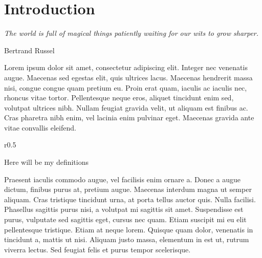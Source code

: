 \chapter{Introduction}
\epigraph{\emph{The world is full of magical things patiently waiting for our wits to grow sharper.}}{Bertrand Russel}


Lorem ipsum dolor sit amet, consectetur adipiscing elit. Integer nec venenatis augue. Maecenas sed egestas elit, quis ultrices lacus. Maecenas hendrerit massa nisi, congue congue quam pretium eu. Proin erat quam, iaculis ac iaculis nec, rhoncus vitae tortor. Pellentesque neque eros, aliquet tincidunt enim sed, volutpat ultrices nibh. Nullam feugiat gravida velit, ut aliquam est finibus ac. Cras pharetra nibh enim, vel lacinia enim pulvinar eget. Maecenas gravida ante vitae convallis eleifend.

\begin{wrapfigure}{r}{0.5\textwidth}
  \vspace{-20pt}
  \begin{center}
        \begin{definitions}
        Here will be my definitions
        \end{definitions}  
  \end{center}
  \vspace{-20pt}
\end{wrapfigure}

Praesent iaculis commodo augue, vel facilisis enim ornare a. Donec a augue dictum, finibus purus at, pretium augue. Maecenas interdum magna ut semper aliquam. Cras tristique tincidunt urna, at porta tellus auctor quis. Nulla facilisi. Phasellus sagittis purus nisi, a volutpat mi sagittis sit amet. Suspendisse est purus, vulputate sed sagittis eget, cursus nec quam. Etiam suscipit mi eu elit pellentesque tristique. Etiam at neque lorem. Quisque quam dolor, venenatis in tincidunt a, mattis ut nisi. Aliquam justo massa, elementum in est ut, rutrum viverra lectus. Sed feugiat felis et purus tempor scelerisque.

\clearpage
%

%  

